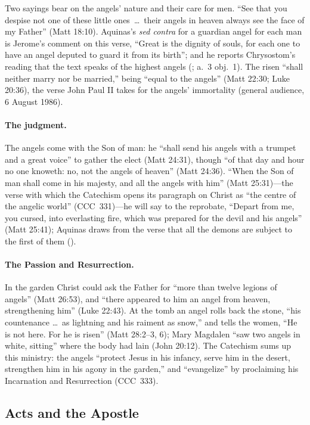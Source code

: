 Two sayings bear on the angels' nature and their care for men. ``See that
you despise not one of these little ones~\dots\ their angels in heaven
always see the face of my Father'' (Matt 18:10). Aquinas's \emph{sed
contra} for a guardian angel for each man is Jerome's comment on this
verse, ``Great is the dignity of souls, for each one to have an angel
deputed to guard it from its birth''; and he reports Chrysostom's reading
that the text speaks of the highest angels (; a.~3
obj.~1). The risen ``shall neither marry nor be married,'' being ``equal
to the angels'' (Matt 22:30; Luke 20:36), the verse John Paul II takes for
the angels' immortality (general audience, 6 August 1986).

\paragraph{The judgment.} The angels come with the Son of man: he ``shall
send his angels with a trumpet and a great voice'' to gather the elect
(Matt 24:31), though ``of that day and hour no one knoweth: no, not the
angels of heaven'' (Matt 24:36). ``When the Son of man shall come in his
majesty, and all the angels with him'' (Matt 25:31)---the verse with which
the Catechism opens its paragraph on Christ as ``the centre of the angelic
world'' (CCC~331)---he will say to the reprobate, ``Depart from me, you
cursed, into everlasting fire, which was prepared for the devil and his
angels'' (Matt 25:41); Aquinas draws from the verse that all the demons
are subject to the first of them ().

\paragraph{The Passion and Resurrection.} In the garden Christ could ask
the Father for ``more than twelve legions of angels'' (Matt 26:53), and
``there appeared to him an angel from heaven, strengthening him'' (Luke
22:43). At the tomb an angel rolls back the stone, ``his countenance
\dots\ as lightning and his raiment as snow,'' and tells the women, ``He
is not here. For he is risen'' (Matt 28:2--3, 6); Mary Magdalen ``saw two
angels in white, sitting'' where the body had lain (John 20:12). The
Catechism sums up this ministry: the angels ``protect Jesus in his
infancy, serve him in the desert, strengthen him in his agony in the
garden,'' and ``evangelize'' by proclaiming his Incarnation and
Resurrection (CCC~333).

\subsection{Acts and the Apostle}

